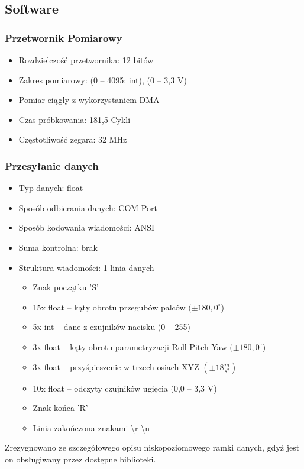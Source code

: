 \documentclass[12pt,a4paper]{article}
\begin{document}
\subsection{Software}
\subsubsection{Przetwornik Pomiarowy}
\begin{itemize}
\item Rozdzielczość przetwornika: 12 bitów
\item Zakres pomiarowy: (0 -- 4095: int), (0 -- 3,3 V)
\item Pomiar ciągły z wykorzystaniem DMA
\item Czas próbkowania: 181,5 Cykli
\item Częstotliwość zegara: 32 MHz
\end{itemize}

\subsubsection{Przesyłanie danych}
\begin{itemize}
\item Typ danych: float
\item Sposób odbierania danych: COM Port
\item Sposób kodowania wiadomości: ANSI
\item Suma kontrolna: brak
\item Struktura wiadomości: 1 linia danych
\begin{itemize}
\item Znak początku 'S'
\item 15x float -- kąty obrotu przegubów palców $(\pm 180,0 ^\circ$)
\item 5x int -- dane z czujników nacisku (0 -- 255)
\item 3x float -- kąty obrotu parametryzacji Roll Pitch Yaw $(\pm 180,0^\circ$)
\item 3x float -- przyśpieszenie w trzech osiach XYZ $(\pm 18 \frac{m}{s^2})$
\item 10x float -- odczyty czujników ugięcia (0,0 -- 3,3 V)
\item Znak końca 'R'
\item Linia zakończona znakami \textbackslash r \textbackslash n
\end{itemize}
\end{itemize}
Zrezygnowano ze szczegółowego opisu niskopoziomowego ramki danych, gdyż jest on obsługiwany przez dostępne biblioteki.
\end{document}
